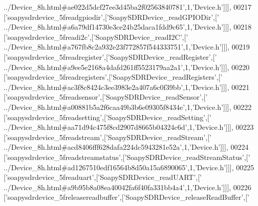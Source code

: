 \begin{DoxyCode}
{      ../Device\_8h.html#ae022d5dcf27ee3d45ba2f02563840781'},1,\textcolor{stringliteral}{'Device.h'}]]],
00217   [\textcolor{stringliteral}{'soapysdrdevice\_5freadgpiodir'},[\textcolor{stringliteral}{'SoapySDRDevice\_readGPIODir'},[\textcolor{stringliteral}{'
      ../Device\_8h.html#a6a79df14730e3ce24b25daca1fdd9c65'},1,\textcolor{stringliteral}{'Device.h'}]]],
00218   [\textcolor{stringliteral}{'soapysdrdevice\_5freadi2c'},[\textcolor{stringliteral}{'SoapySDRDevice\_readI2C'},[\textcolor{stringliteral}{'
      ../Device\_8h.html#a767fb8c2a932e23f772857f544333751'},1,\textcolor{stringliteral}{'Device.h'}]]],
00219   [\textcolor{stringliteral}{'soapysdrdevice\_5freadregister'},[\textcolor{stringliteral}{'SoapySDRDevice\_readRegister'},[\textcolor{stringliteral}{'
      ../Device\_8h.html#a9ee5e2168a4dafd261ff5523179aa2a1'},1,\textcolor{stringliteral}{'Device.h'}]]],
00220   [\textcolor{stringliteral}{'soapysdrdevice\_5freadregisters'},[\textcolor{stringliteral}{'SoapySDRDevice\_readRegisters'},[\textcolor{stringliteral}{'
      ../Device\_8h.html#ac3f8c8424c3ee3983e2a407a6c0f39bb'},1,\textcolor{stringliteral}{'Device.h'}]]],
00221   [\textcolor{stringliteral}{'soapysdrdevice\_5freadsensor'},[\textcolor{stringliteral}{'SoapySDRDevice\_readSensor'},[\textcolor{stringliteral}{'
      ../Device\_8h.html#a00881b5a2f6caa49b3b6e09305f8434e'},1,\textcolor{stringliteral}{'Device.h'}]]],
00222   [\textcolor{stringliteral}{'soapysdrdevice\_5freadsetting'},[\textcolor{stringliteral}{'SoapySDRDevice\_readSetting'},[\textcolor{stringliteral}{'
      ../Device\_8h.html#aa71d94c475f8cd2907d8665b04324c6d'},1,\textcolor{stringliteral}{'Device.h'}]]],
00223   [\textcolor{stringliteral}{'soapysdrdevice\_5freadstream'},[\textcolor{stringliteral}{'SoapySDRDevice\_readStream'},[\textcolor{stringliteral}{'
      ../Device\_8h.html#acd8406fff628dafa224dc5943281e52a'},1,\textcolor{stringliteral}{'Device.h'}]]],
00224   [\textcolor{stringliteral}{'soapysdrdevice\_5freadstreamstatus'},[\textcolor{stringliteral}{'SoapySDRDevice\_readStreamStatus'},[\textcolor{stringliteral}{'
      ../Device\_8h.html#ad1267510edf16564b8d50a15a6890065'},1,\textcolor{stringliteral}{'Device.h'}]]],
00225   [\textcolor{stringliteral}{'soapysdrdevice\_5freaduart'},[\textcolor{stringliteral}{'SoapySDRDevice\_readUART'},[\textcolor{stringliteral}{'
      ../Device\_8h.html#a9b95b8a08ea40042fa6f40fa331bb4a4'},1,\textcolor{stringliteral}{'Device.h'}]]],
00226   [\textcolor{stringliteral}{'soapysdrdevice\_5freleasereadbuffer'},[\textcolor{stringliteral}{'SoapySDRDevice\_releaseReadBuffer'},[\textcolor{stringliteral}{'
}
\end{DoxyCode}
